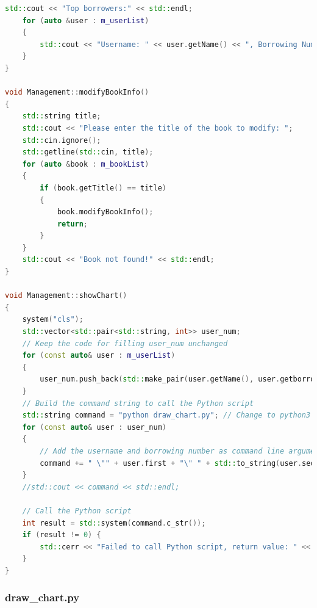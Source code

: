\documentclass[12pt,twoside]{ctexart}
\begin{document}
\begin{lstlisting}[language=C++]
    std::cout << "Top borrowers:" << std::endl;
    for (auto &user : m_userList)
    {
        std::cout << "Username: " << user.getName() << ", Borrowing Number: " << user.getborrowingNum() << std::endl;
    }
}

void Management::modifyBookInfo()
{
    std::string title;
    std::cout << "Please enter the title of the book to modify: ";
    std::cin.ignore();
    std::getline(std::cin, title);
    for (auto &book : m_bookList)
    {
        if (book.getTitle() == title)
        {
            book.modifyBookInfo();
            return;
        }
    }
    std::cout << "Book not found!" << std::endl;
}

void Management::showChart()
{
    system("cls");
    std::vector<std::pair<std::string, int>> user_num;
    // Keep the code for filling user_num unchanged
    for (const auto& user : m_userList)
    {
        user_num.push_back(std::make_pair(user.getName(), user.getborrowingNum()));
    }
    // Build the command string to call the Python script
    std::string command = "python draw_chart.py"; // Change to python3 depending on your system environment
    for (const auto& user : user_num)
    {
        // Add the username and borrowing number as command line arguments
        command += " \"" + user.first + "\" " + std::to_string(user.second);
    }
    //std::cout << command << std::endl;

    // Call the Python script
    int result = std::system(command.c_str());
    if (result != 0) {
        std::cerr << "Failed to call Python script, return value: " << result << std::endl;
    }
}
\end{lstlisting}

\newpage
\subsubsection{draw\_chart.py}
\end{document}
